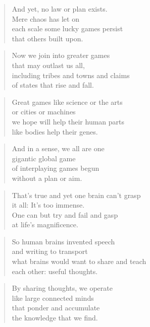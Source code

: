 \documentclass[10pt,a4paper]{article}
\begin{document}
\begin{multicols}{2}
\begin{verse}
And yet, no law or plan exists.\\
Mere chaos has let on\\
each scale some lucky games persist\\
that others built upon.
\end{verse}

\begin{verse}
Now we join into greater games\\
that may outlast us all,\\
including tribes and towns and claims\\
of states that rise and fall.
\end{verse}

\begin{verse}
Great games like science or the arts\\
or cities or machines\\
we hope will help their human parts\\
like bodies help their genes.
\end{verse}

\begin{verse}
And in a sense, we all are one\\
gigantic global game\\
of interplaying games begun\\
without a plan or aim.
\end{verse}

\begin{verse}
That’s true and yet one brain can’t grasp\\
it all: It’s too immense.\\
One can but try and fail and gasp\\
at life’s magnificence.
\end{verse}

\begin{verse}
So human brains invented speech\\
and writing to transport\\
what brains would want to share and teach\\
each other: useful thoughts.
\end{verse}

\begin{verse}
By sharing thoughts, we operate\\
like large connected minds\\
that ponder and accumulate\\
the knowledge that we find.
\end{verse}


\end{multicols}
\end{document}
